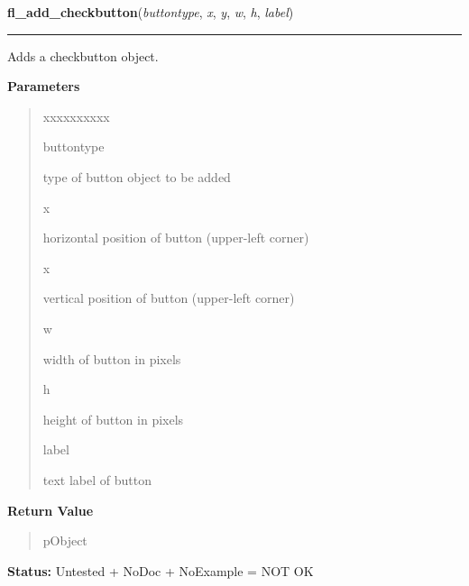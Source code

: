     \label{xformslib:library:fl_add_checkbutton}

    \vspace{0.5ex}

\hspace{.8\funcindent}\begin{boxedminipage}{\funcwidth}

    \raggedright \textbf{fl\_add\_checkbutton}(\textit{buttontype}, \textit{x}, \textit{y}, \textit{w}, \textit{h}, \textit{label})

    \vspace{-1.5ex}

    \rule{\textwidth}{0.5\fboxrule}
\setlength{\parskip}{2ex}
    Adds a checkbutton object.

\setlength{\parskip}{1ex}
      \textbf{Parameters}
      \vspace{-1ex}

      \begin{quote}
        \begin{Ventry}{xxxxxxxxxx}

          \item[buttontype]

          type of button object to be added

          \item[x]

          horizontal position of button (upper-left corner)

          \item[x]

          vertical position of button (upper-left corner)

          \item[w]

          width of button in pixels

          \item[h]

          height of button in pixels

          \item[label]

          text label of button

        \end{Ventry}

      \end{quote}

      \textbf{Return Value}
    \vspace{-1ex}

      \begin{quote}
      pObject

      \end{quote}

\textbf{Status:} Untested + NoDoc + NoExample = NOT OK



    \end{boxedminipage}

